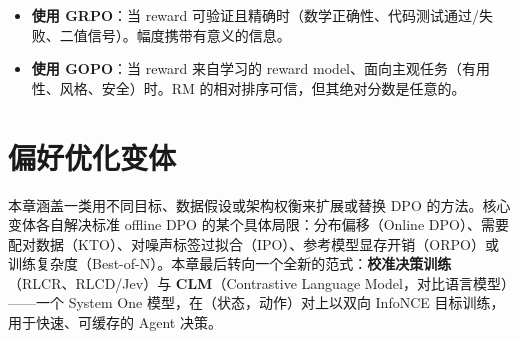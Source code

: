 \begin{intuitionbox}
\begin{itemize}
  \item \textbf{使用 GRPO}：当 reward 可验证且精确时（数学正确性、代码测试通过/失败、二值信号）。幅度携带有意义的信息。
  \item \textbf{使用 GOPO}：当 reward 来自学习的 reward model、面向主观任务（有用性、风格、安全）时。RM 的相对排序可信，但其绝对分数是任意的。
\end{itemize}
\end{intuitionbox}

\chapter{偏好优化变体}
\label{ch:po-variants}

本章涵盖一类用不同目标、数据假设或架构权衡来扩展或替换 DPO 的方法。核心变体各自解决标准 offline DPO 的某个具体局限：分布偏移（Online DPO）、需要配对数据（KTO）、对噪声标签过拟合（IPO）、参考模型显存开销（ORPO）或训练复杂度（Best-of-N）。本章最后转向一个全新的范式：\textbf{校准决策训练}（RLCR、RLCD/Jev）与 \textbf{CLM}（Contrastive Language Model，对比语言模型）——一个 System One 模型，在（状态，动作）对上以双向 InfoNCE 目标训练，用于快速、可缓存的 Agent 决策。

